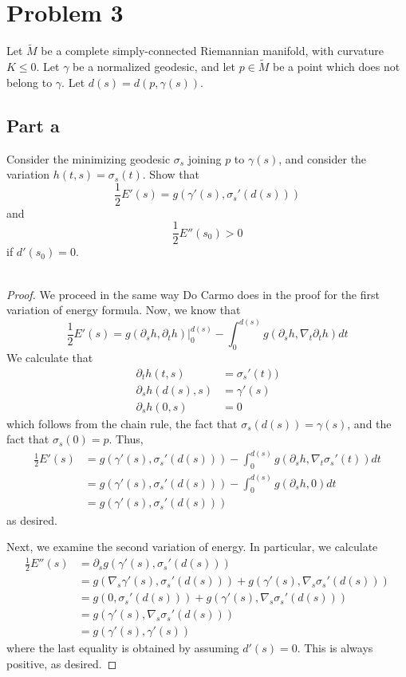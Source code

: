 \documentclass[fontsize=11pt]{scrartcl} %
\numberwithin{equation}{section} %
\numberwithin{figure}{section} %
\numberwithin{table}{section} %
\begin{document}
\newpage

\section*{Problem 3}
Let $\tilde{M}$ be a complete simply-connected Riemannian manifold, with
curvature $K\leq 0$. Let $\gamma$ be a normalized geodesic, and let $p\in
\tilde{M}$ be a point which does not belong to $\gamma$. Let $d(s) =
d(p,\gamma(s))$.

\subsection*{Part a}
Consider the minimizing geodesic $\sigma_s$ joining $p$ to $\gamma(s)$, and
consider the variation $h(t,s) = \sigma_s(t)$. Show that
\[
    \frac{1}{2}E'(s) = g(\gamma'(s),\sigma_s'(d(s)))
\]
and
\[
    \frac{1}{2}E''(s_0) >0
\]
if $d'(s_0)=0$.
\\
\\

\begin{proof}
    We proceed in the same way Do Carmo does in the proof for the first
    variation of energy formula. Now, we know that
    \[
        \frac{1}{2}E'(s) = g(\partial_sh,\partial_th)|_0^{d(s)} -
        \int_0^{d(s)}g(\partial_s h,\nabla_t\partial_th)dt
    \]
    We calculate that
    \[
\begin{aligned}
    \partial_t h(t,s) &= \sigma_s'(t))\\
    \partial_s h(d(s),s) &= \gamma'(s)\\
    \partial_s h(0,s) &= 0
\end{aligned}
    \]
    which follows from the chain rule, the fact that $\sigma_s(d(s)) =
    \gamma(s)$, and the fact that $\sigma_s(0) = p$. Thus,
    \[
        \begin{aligned}
        \frac{1}{2}E'(s) &= g(\gamma'(s),\sigma_s'(d(s))) -
        \int_0^{d(s)}g(\partial_s h,\nabla_t\sigma_s'(t))dt\\
        &= g(\gamma'(s),\sigma_s'(d(s))) -
        \int_0^{d(s)}g(\partial_s h,0)dt\\
        &=g(\gamma'(s),\sigma_s'(d(s)))
    \end{aligned}
    \]
    as desired.
    
    Next, we examine the second variation of energy. In particular, we calculate
    \[
        \begin{aligned}
            \frac{1}{2}E''(s) &= \partial_s g(\gamma'(s),\sigma_s'(d(s)))\\
            &= g(\nabla_s\gamma'(s),\sigma_s'(d(s))) +
            g(\gamma'(s),\nabla_s\sigma_s'(d(s)))\\
            &= g(0,\sigma_s'(d(s))) +
            g(\gamma'(s),\nabla_s\sigma_s'(d(s)))\\
            &=g(\gamma'(s),\nabla_s\sigma_s'(d(s)))\\
            &= g(\gamma'(s), \gamma'(s))
        \end{aligned}
    \]
    where the last equality is obtained by assuming $d'(s) = 0$. This is always
    positive, as desired.
\end{proof}
\end{document}
